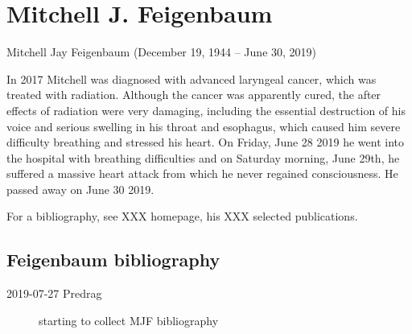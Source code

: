 
\chapter{Mitchell J. Feigenbaum}
\label{c-Feigenbaum}

Mitchell Jay Feigenbaum (December 19, 1944 -- June 30, 2019)
\bigskip

In 2017 Mitchell was diagnosed with advanced laryngeal cancer, which was
treated with radiation. Although the cancer was apparently cured, the
after effects of radiation were very damaging, including the essential
destruction of his voice and serious swelling in his throat and
esophagus, which caused him severe difficulty breathing and stressed his
heart. On Friday, June 28 2019 he went into the hospital with breathing
difficulties and on Saturday morning, June 29th, he suffered a massive
heart attack from which he never regained consciousness. He passed away
on June 30 2019.
\bigskip

For a bibliography, see
{XXX} homepage,
his
{XXX selected publications}.

\section{Feigenbaum bibliography}
\label{sect:Feigenbaum}

\begin{description}
\item[2019-07-27 Predrag]
starting to collect MJF bibliography
\end{description}

